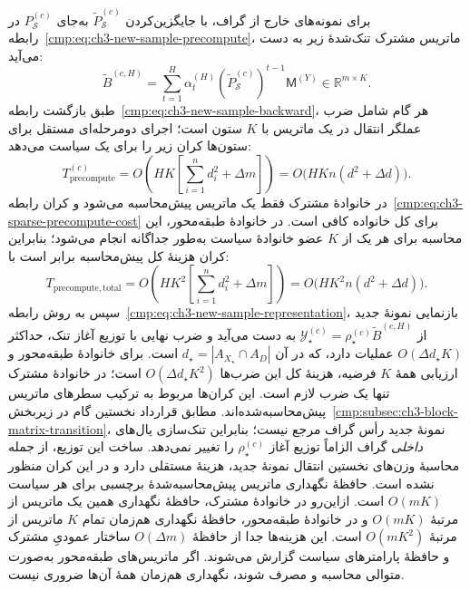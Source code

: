 برای نمونه‌های خارج از گراف،
با جایگزین‌کردن
$\widetilde P_{\mathcal S}^{(c)}$
به‌جای $P_{\mathcal S}^{(c)}$
در رابطه~\eqref{cmp:eq:ch3-new-sample-precompute}،
ماتریس مشترک تنک‌شدهٔ زیر
به دست می‌آید:
\begin{equation}\label{cmp:eq:ch3-sparse-precompute-matrix}
\boxed{
\widetilde B^{(c,H)}
=\sum_{t=1}^{H}\alpha_t^{(H)}
(\widetilde P_{\mathcal S}^{(c)})^{t-1}
\mathsf M^{(Y)}
\in\mathbb R^{m\times K}.
}
\end{equation}
طبق بازگشت
رابطه~\eqref{cmp:eq:ch3-new-sample-backward}،
هر گام شامل ضرب عملگر انتقال
در یک ماتریس با $K$ ستون است؛
اجرای دومرحله‌ای مستقل برای
ستون‌ها کران زیر را برای
یک سیاست می‌دهد:
\begin{equation}\label{cmp:eq:ch3-sparse-precompute-cost}
\boxed{
T_{\mathrm{precompute}}^{(c)}
=O\left(HK\left[
\sum_{i=1}^{n}d_i^2+\Delta m
\right]\right)
=O\bigl(HK n(d^2+\Delta d)\bigr).
}
\end{equation}
در خانوادهٔ مشترک فقط یک ماتریس
پیش‌محاسبه می‌شود و کران
رابطه~\eqref{cmp:eq:ch3-sparse-precompute-cost}
برای کل خانواده کافی است.
در خانوادهٔ طبقه‌محور، این محاسبه
برای هر یک از $K$ عضو خانوادهٔ سیاست
به‌طور جداگانه انجام می‌شود؛ بنابراین
کران هزینهٔ کل پیش‌محاسبه برابر است با:
\begin{equation}\label{cmp:eq:ch3-sparse-precompute-total-cost}
\boxed{
T_{\mathrm{precompute,total}}
=O\left(HK^2\left[
\sum_{i=1}^{n}d_i^2+\Delta m
\right]\right)
=O\bigl(HK^2n(d^2+\Delta d)\bigr).
}
\end{equation}
سپس به روش
رابطه~\eqref{cmp:eq:ch3-new-sample-representation}،
بازنمایی نمونهٔ جدید از
$\mathscr Y_\star^{(c)}
=\rho_\star^{(c)}\widetilde B^{(c,H)}$
به دست می‌آید و ضرب نهایی
با توزیع آغاز تنک، حداکثر
$O(\Delta d_\star K)$ عملیات دارد، که در آن
$d_\star=|A_{X_\star}\cap A_D|$ است.
برای خانوادهٔ طبقه‌محور و ارزیابی همهٔ $K$
فرضیه، هزینهٔ کل این ضرب‌ها
$O(\Delta d_\star K^2)$ است؛ در خانوادهٔ مشترک
تنها یک ضرب لازم است. این کران‌ها مربوط به
ترکیب سطرهای ماتریس پیش‌محاسبه‌شده‌اند.
مطابق قرارداد نخستین گام در
زیربخش~\ref{cmp:subsec:ch3-block-matrix-transition}،
نمونهٔ جدید رأس گراف مرجع
نیست؛ بنابراین تنک‌سازی
یال‌های \emph{داخلی} گراف
الزاماً توزیع آغاز
$\rho_\star^{(c)}$ را تغییر
نمی‌دهد. ساخت این توزیع،
از جمله محاسبهٔ وزن‌های
نخستین انتقال نمونهٔ جدید،
هزینهٔ مستقلی دارد و در
این کران منظور نشده است.
حافظهٔ نگهداری ماتریس پیش‌محاسبه‌شدهٔ
برچسبی برای هر سیاست $O(mK)$ است.
ازاین‌رو در خانوادهٔ مشترک، حافظهٔ
نگهداری همین یک ماتریس از مرتبهٔ
$O(mK)$ و در خانوادهٔ طبقه‌محور،
حافظهٔ نگهداری هم‌زمان تمام $K$
ماتریس از مرتبهٔ $O(mK^2)$ است.
این هزینه‌ها جدا از حافظهٔ
$O(\Delta m)$ ساختار عمودیِ مشترک
و حافظهٔ پارامترهای سیاست گزارش
می‌شوند. اگر ماتریس‌های طبقه‌محور
به‌صورت متوالی محاسبه و مصرف شوند،
نگهداری هم‌زمان همهٔ آن‌ها ضروری نیست.

